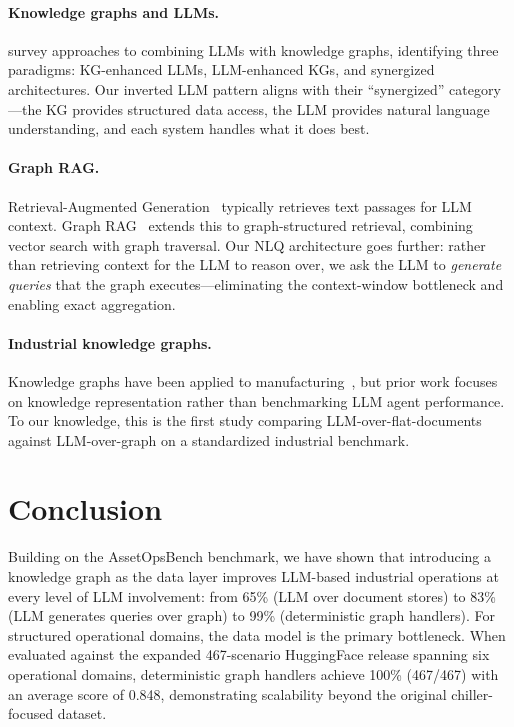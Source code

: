 \documentclass[11pt]{article}
\begin{document}
\paragraph{Knowledge graphs and LLMs.} \citet{pan2024unifying} survey approaches to combining LLMs with knowledge graphs, identifying three paradigms: KG-enhanced LLMs, LLM-enhanced KGs, and synergized architectures. Our inverted LLM pattern aligns with their ``synergized'' category---the KG provides structured data access, the LLM provides natural language understanding, and each system handles what it does best.

\paragraph{Graph RAG.} Retrieval-Augmented Generation~\citep{lewis2020rag} typically retrieves text passages for LLM context. Graph RAG~\citep{edge2024graphrag} extends this to graph-structured retrieval, combining vector search with graph traversal. Our NLQ architecture goes further: rather than retrieving context for the LLM to reason over, we ask the LLM to \emph{generate queries} that the graph executes---eliminating the context-window bottleneck and enabling exact aggregation.

\paragraph{Industrial knowledge graphs.} Knowledge graphs have been applied to manufacturing~\citep{hogan2021knowledge}, but prior work focuses on knowledge representation rather than benchmarking LLM agent performance. To our knowledge, this is the first study comparing LLM-over-flat-documents against LLM-over-graph on a standardized industrial benchmark.

\section{Conclusion}

Building on the AssetOpsBench benchmark, we have shown that introducing a knowledge graph as the data layer improves LLM-based industrial operations at every level of LLM involvement: from 65\% (LLM over document stores) to 83\% (LLM generates queries over graph) to 99\% (deterministic graph handlers). For structured operational domains, the data model is the primary bottleneck. When evaluated against the expanded 467-scenario HuggingFace release spanning six operational domains, deterministic graph handlers achieve 100\% (467/467) with an average score of 0.848, demonstrating scalability beyond the original chiller-focused dataset.
\end{document}
